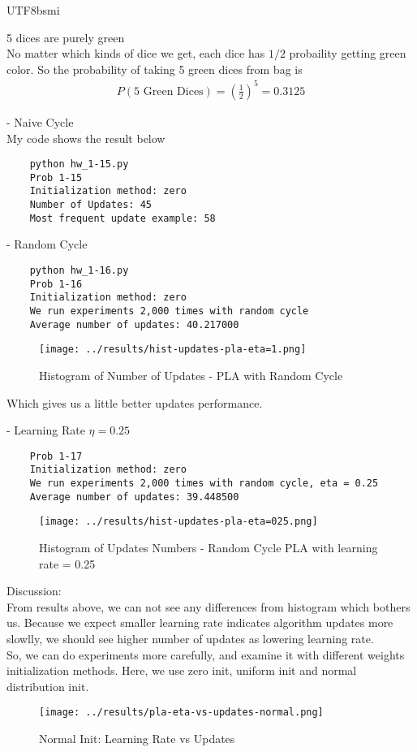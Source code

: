\documentclass[12pt]{article}
\newenvironment{prob}[2][Prob.]{\begin{trivlist}
\item[\hskip \labelsep {\bfseries #1}\hskip \labelsep {\bfseries #2}]}{\end{trivlist}}
\begin{document}
\begin{CJK}{UTF8}{bsmi}
\begin{prob}{14} 5 dices are purely green \\
	No matter which kinds of dice we get, each dice has $1/2$ probaility getting green color. 
	So the probability of taking 5 green dices from bag is 
	\begin{align*}
		P(\text{5 Green Dices}) = (\frac{1}{2})^5 = 0.3125
	\end{align*}
\end{prob}

\begin{prob}{15}  - Naive Cycle \\
My code shows the result below
\begin{lstlisting}
	python hw_1-15.py
	Prob 1-15
	Initialization method: zero
	Number of Updates: 45
	Most frequent update example: 58
\end{lstlisting}
\end{prob}

\begin{prob}{16} - Random Cycle \\
\begin{lstlisting}
	python hw_1-16.py
	Prob 1-16
	Initialization method: zero
	We run experiments 2,000 times with random cycle
	Average number of updates: 40.217000
\end{lstlisting}
\begin{figure}[H]
	\centering
	\texttt{[image: ../results/hist-updates-pla-eta=1.png]}
	\caption{Histogram of Number of Updates - PLA with Random Cycle}
	\label{fig-1-16}
\end{figure}
Which gives us a little better updates performance.
\end{prob}

\begin{prob}{17} - Learning Rate $\eta = 0.25$ \\
\begin{lstlisting}
	Prob 1-17
	Initialization method: zero
	We run experiments 2,000 times with random cycle, eta = 0.25
	Average number of updates: 39.448500
\end{lstlisting}
\begin{figure}[H]
	\centering
	\texttt{[image: ../results/hist-updates-pla-eta=025.png]}
	\caption{Histogram of Updates Numbers - Random Cycle PLA with learning rate = 0.25}
	\label{fig-1-17}
\end{figure}
Discussion: \\
From results above, we can not see any differences from histogram which bothers us. Because we expect smaller learning rate indicates algorithm updates more slowlly, we should see higher number of updates as lowering learning rate. \\
So, we can do experiments more carefully, and examine it with different weights initialization methods. Here, we use zero init, uniform init and normal distribution init.
\begin{figure}[H]
	\centering
	\texttt{[image: ../results/pla-eta-vs-updates-normal.png]}
	\caption{Normal Init: Learning Rate vs Updates}
	\label{fig-1-17}
\end{figure}


\end{prob}
\end{CJK}
\end{document}
